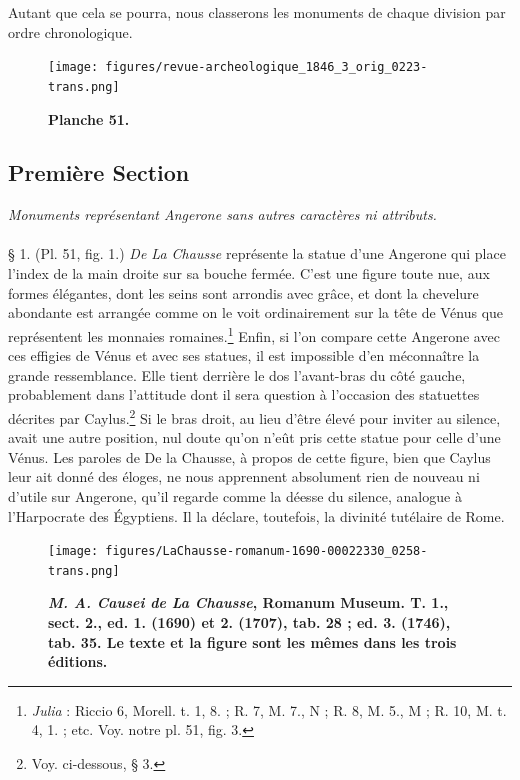 \documentclass[a4paper, 11pt, oneside, polutonikogreek, french]{article}
\begin{document}
Autant que cela se pourra, nous classerons les monuments de chaque division par ordre chronologique.
\clearpage

\vspace*{\fill}
\begin{figure}[H]
\centering
\texttt{[image: figures/revue-archeologique\_1846\_3\_orig\_0223-trans.png]}
\caption{\bfseries Planche 51.}
\end{figure}
\vspace*{\fill}

\clearpage
\subsection{Première Section}
\begin{center}
\emph{Monuments représentant Angerone sans autres caractères ni attributs.}
\end{center}
\paragraph{}
§ 1. (Pl. 51, fig. 1.) \emph{De La Chausse} représente la statue d'une Angerone qui place l'index de la main droite sur sa bouche fermée. C'est une figure toute nue, aux formes élégantes, dont les seins sont arrondis avec grâce, et dont la chevelure abondante est arrangée comme on le voit ordinairement sur la tête de Vénus que représentent les monnaies romaines.\footnote{\emph{Julia} : Riccio 6, Morell. t. 1, 8. ; R. 7, M. 7., N ; R. 8, M. 5., M ; R. 10, M. t. 4, 1. ; etc. Voy. notre pl. 51, fig. 3.} Enfin, si l'on compare cette Angerone avec ces effigies de Vénus et avec ses statues, il est impossible d'en méconnaître la grande ressemblance. Elle tient derrière le dos l'avant-bras du côté gauche, probablement dans l'attitude dont il sera question à l'occasion des statuettes décrites par Caylus.\footnote{Voy. ci-dessous, § 3.} Si le bras droit, au lieu d'être élevé pour inviter au silence, avait une autre position, nul doute qu'on n'eût pris cette statue pour celle d'une Vénus. Les paroles de De la Chausse, à propos de cette figure, bien que Caylus leur ait donné des éloges, ne nous apprennent absolument rien de nouveau ni d'utile sur Angerone, qu'il regarde comme la déesse du silence, analogue à l'Harpocrate des Égyptiens. Il la déclare, toutefois, la divinité tutélaire de Rome.

\begin{figure}[H]
\centering
\texttt{[image: figures/LaChausse-romanum-1690-00022330\_0258-trans.png]}
\caption{\bfseries \emph{M. A. Causei de La Chausse}, Romanum Museum. T. 1., sect. 2., ed. 1. (1690) et 2. (1707), tab. 28 ; ed. 3. (1746), tab. 35. Le texte et la figure sont les mêmes dans les trois éditions.}
\end{figure}
\end{document}
